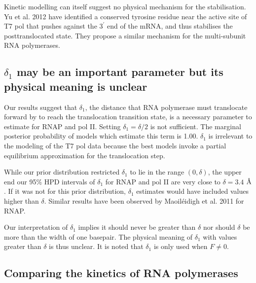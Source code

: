 \documentclass[10pt,letterpaper]{article}
\newcommand{\angstrom}{\mbox{\normalfont\AA}}
\begin{document}
Kinetic modelling can itself suggest no physical mechanism for the stabilisation. Yu et al. 2012 \cite{yu2012small} have identified a conserved tyrosine residue near the active site of T7 pol that pushes against the $3^\prime$ end of the mRNA, and thus stabilises the posttranslocated state. They propose a similar mechanism for the multi-subunit RNA polymerases.  \par




\subsection*{$\delta_1$ may be an important parameter but its physical meaning is unclear}

Our results suggest that $\delta_1$, the distance that RNA polymerase must translocate forward by to reach the translocation transition state, is a necessary parameter to estimate for RNAP and pol II. Setting $\delta_1 = \delta / 2$ is not sufficient. The marginal posterior probability of models which estimate this term is 1.00. $\delta_1$ is irrelevant to the modeling of the T7 pol data because the best models invoke a partial equilibrium approximation for the translocation step.




While our prior distribution restricted $\delta_1$ to lie in the range $(0, \delta)$, the upper end our 95\% HPD intervals of $\delta_1$ for RNAP and pol II are very close to $\delta = 3.4$ $\angstrom$. If it was not for this prior distribution, $\delta_1$ estimates would have included values higher than $\delta$. Similar results have been observed by Maoil{\'e}idigh et al. 2011 \cite{maoileidigh2011unified} for RNAP. \par

Our interpretation of $\delta_1$ implies it should never be greater than $\delta$ nor should $\delta$ be more than the width of one basepair. The physical meaning of $\delta_1$ with values greater than $\delta$ is thus unclear. It is noted that $\delta_1$ is only used when $F \neq 0$. \\





\subsection*{Comparing the kinetics of RNA polymerases}
\end{document}
